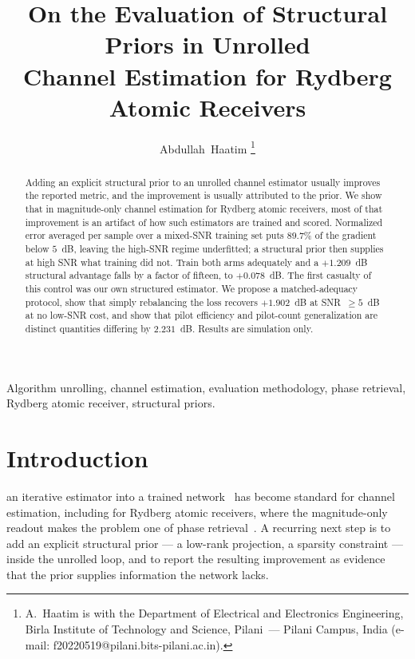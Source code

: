 \documentclass[journal]{IEEEtran}
\begin{document}
\title{On the Evaluation of Structural Priors in Unrolled\\
Channel Estimation for Rydberg Atomic Receivers}

\author{Abdullah~Haatim%
\thanks{A.~Haatim is with the Department of Electrical and Electronics
Engineering, Birla Institute of Technology and Science, Pilani~--- Pilani
Campus, India (e-mail:
f20220519@pilani.bits-pilani.ac.in).}}

\maketitle

\begin{abstract}
Adding an explicit structural prior to an unrolled channel estimator usually
improves the reported metric, and the improvement is usually attributed to the
prior. We show that in magnitude-only channel estimation for Rydberg atomic
receivers, most of that improvement is an artifact of how such estimators are
trained and scored. Normalized error averaged per sample over a mixed-SNR
training set puts $89.7\%$ of the gradient below $5$~dB, leaving the
high-SNR regime underfitted; a structural prior then supplies at high SNR what
training did not. Train both arms adequately and a $+1.209$~dB structural
advantage falls by a factor of fifteen, to $+0.078$~dB. The first casualty of
this control was our own structured estimator. We propose a matched-adequacy
protocol, show that simply rebalancing the loss recovers $+1.902$~dB at
SNR~$\ge5$~dB at no low-SNR cost, and show that pilot efficiency and
pilot-count generalization are distinct quantities differing by $2.231$~dB.
Results are simulation only.
\end{abstract}

\begin{IEEEkeywords}
Algorithm unrolling, channel estimation, evaluation methodology, phase
retrieval, Rydberg atomic receiver, structural priors.
\end{IEEEkeywords}

\section{Introduction}

 an iterative estimator into a trained
network~\cite{gregor2010,monga2021} has become standard for channel estimation,
including for Rydberg atomic receivers, where the magnitude-only readout makes
the problem one of phase retrieval~\cite{xiao2026,cui2025}. A recurring next
step is to add an explicit structural prior --- a low-rank projection, a
sparsity constraint --- inside the unrolled loop, and to report the resulting
improvement as evidence that the prior supplies information the network lacks.
\end{document}
